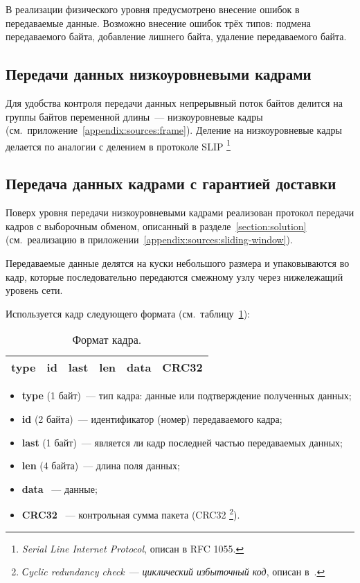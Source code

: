 \documentclass[a4paper,10pt]{article}
\begin{document}
В реализации физического уровня предусмотрено внесение ошибок в передаваемые данные.
Возможно внесение ошибок трёх типов: подмена передаваемого байта, 
добавление лишнего байта, удаление передаваемого байта.

\subsection{Передачи данных низкоуровневыми кадрами}
Для удобства контроля передачи данных 
непрерывный поток байтов делится на группы байтов переменной длины~--- 
низкоуровневые кадры
(см.~приложение~\ref{appendix:sources:frame}).
Деление на низкоуровневые кадры делается по аналогии с делением в протоколе SLIP%
\footnote{\textit{Serial Line Internet Protocol}, описан в RFC 1055.}

\subsection{Передача данных кадрами с гарантией доставки}
Поверх уровня передачи низкоуровневыми кадрами 
реализован протокол передачи кадров с выборочным обменом,
описанный в разделе~\ref{section:solution} 
(см.~реализацию в приложении~\ref{appendix:sources:sliding-window}).

Передаваемые данные делятся на куски небольшого размера и 
упаковываются во кадр,
которые последовательно передаются смежному узлу через 
нижележащий уровень сети.

Используется кадр следующего формата (см.~таблицу~\ref{table:frame}):
\begin{table}[h]
  \begin{center}
    \begin{tabular}{|c|c|c|c|c|c|}
      \hline
      type & id & last & len & data & CRC32 \\
      \hline
    \end{tabular}
  \end{center}
  \caption{Формат кадра.}
  \label{table:frame}
\end{table}
\begin{itemize}
  \item \textbf{type} (1 байт)~--- 
  тип кадра: данные или подтверждение полученных данных;
  \item \textbf{id} (2 байта)~--- 
  идентификатор (номер) передаваемого кадра;
  \item \textbf{last} (1 байт)~--- 
  является ли кадр последней частью передаваемых данных;
  \item \textbf{len} (4 байта)~--- длина поля данных;
  \item \textbf{data} ~--- данные;
  \item \textbf{CRC32} ~--- контрольная сумма пакета (CRC32%
\footnote{\textit{Сyclic redundancy check}~--- \textit{циклический избыточный код}, %
описан в~\cite{peterson1961crc}.%
}).
\end{itemize}
\end{document}
